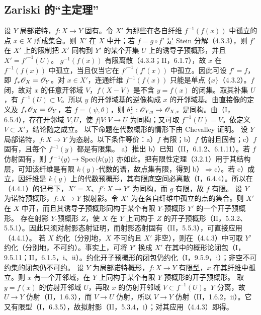 \subsection{Zariski 的“主定理”}
设 $Y$ 局部诺特，$f:X\to Y$ 固有。令 $X'$ 为那些在各自纤维 $f^{-1}(f(x))$ 中孤立的点 $x\in X$ 所成集合。则 $X'$ 在 $X$ 中开；若 $f=g\circ f'$ 是 Stein 分解（4.3.3），则 $f'$ 在 $X'$ 上的限制把 $X'$ 同构到 $Y'$ 的某个开集 $U$ 上的诱导子预概形，并且 $X'=f'^{-1}(U)$。
\eproof
$g^{-1}(f(x))$ 有限离散（4.3.3；II，6.1.7），故 $x$ 在 $f^{-1}(f(x))$ 中孤立，当且仅当它在 $f'^{-1}(f'(x))$ 中孤立。因此可设 $f'=f$，即 $f_*\mathscr O_X=\mathscr O_Y$。对 $x\in X'$，连通纤维 $f^{-1}(f(x))$ 只能是单点 $\{x\}$（4.3.2）。$f$ 闭，故对 $x$ 的任意开邻域 $V$，$f(X-V)$ 是不含 $y=f(x)$ 的闭集。取其补集 $U$，有 $f^{-1}(U)\subset V$。所以 $y$ 的开邻域基的逆像构成 $x$ 的开邻域基。由直接像的定义及 $f_*\mathscr O_X=\mathscr O_Y$，若 $f=(\psi,\theta)$，则 $\theta_x^\sharp:\mathscr O_{Y,y}\to\mathscr O_{X,x}$ 是同构。由（I，6.5.4），存在开邻域 $V,U$，使 $f|V:V\to U$ 为同构；又可取 $f^{-1}(U)=V$。依定义 $V\subset X'$，结论随之成立。\finishproof
以下命题在代数概形的情形下由 Chevalley 证明。
设 $Y$ 局部诺特，$f:X\to Y$ 为态射。以下条件等价：a）$f$ 有限；b）$f$ 仿射且固有；c）$f$ 固有，且每个 $f^{-1}(y)$ 都是有限集。
\eproof
a）推出 b）已知（II，6.1.2、6.1.11）。若 $f$ 仿射固有，则 $f^{-1}(y)\to\operatorname{Spec}(k(y))$ 亦如此。把有限性定理（3.2.1）用于其结构层，可知该纤维是有限 $k(y)$-代数的谱，故点集有限，得到 b）$\Rightarrow$c）。若 c）成立，因纤维是 $k(y)$ 上的代数预概形，其有限底空间必离散（I，6.4.4）。所以在（4.4.1）的记号下，$X'=X$、$f':X\to Y'$ 为同构，而 $g$ 有限，故 $f$ 有限。\finishproof
{}
设 $Y$ 为诺特预概形，$f:X\to Y$ 拟射影。令 $X'$ 为在各自纤维中孤立的点的集合。则 $X'$ 在 $X$ 中开，而且其诱导子预概形同构于某个有限 $Y$-预概形 $Y'$ 的一个开子预概形。
\eproof
存在射影 $Y$-预概形 $Z$，使 $X$ 在 $Y$ 上同构于 $Z$ 的开子预概形（II，5.3.2、5.5.1）。因此只须对射影态射证明，而射影态射固有（II，5.5.3），可直接应用（4.4.1）。\finishproof
{}
若 $X$ 约化（分别地，$X$ 不可约且 $X'$ 非空），则在（4.4.3）中可取 $Y'$ 约化（分别地，不可约）。事实上，可将 $Y'$ 换成 $X'$ 在其中的概形论闭包（I，9.5.11；II，6.1.5，i、ii）。约化开子预概形的闭包仍约化（I，9.5.9，i）；非空不可约集的闭包仍不可约。
设 $Y$ 为局部诺特概形，$f:X\to Y$ 有限型，$x$ 在其纤维中孤立。则 $x$ 有一个开邻域，在 $Y$ 上同构于某个有限 $Y$-预概形的开子预概形。
\eproof
取 $y=f(x)$ 的仿射开邻域 $U$，再取 $x$ 的仿射开邻域 $V\subset f^{-1}(U)$。$Y$ 分离，故 $U\to Y$ 仿射（II，1.6.3），而 $V\to U$ 仿射，所以 $V\to Y$ 仿射（II，1.6.2，ii）。它又有限型（I，6.3.5），故拟射影（II，5.3.4，i）；对其应用（4.4.3）即得。\finishproof
